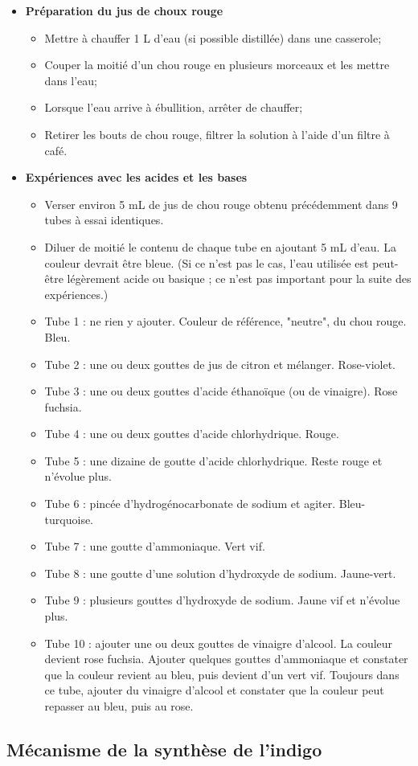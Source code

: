 \documentclass[11pt,a4paper]{report}
\begin{document}
\begin{itemize}
	\item \textbf{Préparation du jus de choux rouge}
	\begin{itemize}
		\item Mettre à chauffer 1 L d'eau (si possible distillée) dans une casserole;
		\item Couper la moitié d'un chou rouge en plusieurs morceaux et les mettre dans l'eau;
		\item Lorsque l'eau arrive à ébullition, arrêter de chauffer;
		\item Retirer les bouts de chou rouge, filtrer la solution à l'aide d'un filtre à café.
	\end{itemize}
	
	\item \textbf{Expériences avec les acides et les bases}
	\begin{itemize}
		\item Verser environ 5 mL de jus de chou rouge obtenu précédemment 
			dans 9 tubes à essai identiques.
		\item Diluer de moitié le contenu de chaque tube en ajoutant 5 mL d'eau. La couleur devrait 				être bleue. (Si ce n'est pas le cas, l'eau utilisée est peut-être légèrement acide ou 					basique ; ce n'est pas important pour la suite des expériences.)\\
		
		\item Tube 1 : ne rien y ajouter. Couleur de référence, "neutre", du chou rouge. Bleu.
		\item Tube 2 : une ou deux gouttes de jus de citron et mélanger. Rose-violet.
		\item Tube 3 : une ou deux gouttes d'acide éthanoïque (ou de vinaigre). Rose fuchsia.
		\item Tube 4 : une ou deux gouttes d'acide chlorhydrique. Rouge.
		\item Tube 5 : une dizaine de goutte d'acide chlorhydrique. Reste rouge et n'évolue plus.
		\item Tube 6 : pincée d'hydrogénocarbonate de sodium et agiter. Bleu-turquoise.
		\item Tube 7 : une goutte d'ammoniaque. Vert vif.
		\item Tube 8 : une goutte d'une solution d'hydroxyde de sodium. Jaune-vert.
		\item Tube 9 : plusieurs gouttes d'hydroxyde de sodium. Jaune vif et n'évolue plus.\\
		
		\item Tube 10 : ajouter une ou deux gouttes de vinaigre d'alcool. La couleur devient rose 						fuchsia. Ajouter quelques gouttes d'ammoniaque et constater que la couleur revient au 					bleu, puis devient d'un vert vif. Toujours dans ce tube, ajouter du vinaigre d'alcool 					et constater que la couleur peut repasser au bleu, puis au rose.
	\end{itemize}
\end{itemize}

\newpage
\subsection*{Mécanisme de la synthèse de l'indigo}
\end{document}
